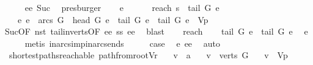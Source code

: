 \begin{isabellebody}
\ \ \ \ \isamarkupfalse%
\ ee{\isacharparenleft}{}{\isacharparenright}\ Suc{\isacharparenleft}{}{\isacharparenright}\ \isamarkupfalse%
\ presburger\isanewline
\ \ \isamarkupfalse%
\ e{\isacharprime}\ \ \isanewline
\ \ \ \ reach{\isacharcolon}\ {\isachardoublequoteopen}s\ {\isasymrightarrow}\isactrlsup {\isacharasterisk}\ tail\ G\ e{\isacharprime}{\isachardoublequoteclose}\ \ \isanewline
\ \ \ \ e{\isacharprime}{\isacharcolon}\ {\isachardoublequoteopen}e{\isacharprime}\ {\isasymin}\ arcs\ G\ {\isasymand}\ head\ G\ e{\isacharprime}\ {\isacharequal}\ tail\ G\ e\ {\isasymand}\ {\isacharparenleft}tail\ G\ e{\isacharprime}{\isacharparenright}\ {\isasymnotin}\ V\isactrlsub p{\isachardoublequoteclose}\ \isanewline
\ \ \ \ \isamarkupfalse%
\ Suc{\isacharparenleft}{}{\isacharparenright}{\isacharbrackleft}OF\ nst\ tail{\isacharunderscore}in{\isacharunderscore}verts{\isacharbrackleft}OF\ ee{\isacharparenleft}{}{\isacharparenright}{\isacharbrackright}\ ss\ ee{\isacharparenleft}{}{\isacharparenright}{\isacharbrackright}\ \isamarkupfalse%
\ blast\isanewline
\ \ \isamarkupfalse%
\ reach\ \isamarkupfalse%
\ \isamarkupfalse%
\ {\isachardoublequoteopen}tail\ G\ e{\isacharprime}\ {\isasymrightarrow}\ tail\ G\ e{\isachardoublequoteclose}\ \isamarkupfalse%
\ e{\isacharprime}\isanewline
\ \ \ \ \isamarkupfalse%
\ {\isacharparenleft}metis\ in{\isacharunderscore}arcs{\isacharunderscore}imp{\isacharunderscore}in{\isacharunderscore}arcs{\isacharunderscore}ends{\isacharparenright}\isanewline
\ \ \isamarkupfalse%
\ \isamarkupfalse%
\ {\isacharquery}case\ \isamarkupfalse%
\ e{\isacharprime}\ ee\ \isamarkupfalse%
\ auto\isanewline
{}\isamarkupfalse%
%
\endisatagproof
{\isafoldproof}%
%
\isadelimproof
\isanewline
%
\endisadelimproof
\isanewline
\isanewline
{}\isamarkupfalse%
\ {\isacharparenleft}\ shortest{\isacharunderscore}paths{\isacharunderscore}reachable{\isacharparenright}\ path{\isacharunderscore}from{\isacharunderscore}root{\isacharunderscore}Vr{\isacharcolon}\isanewline
\ \ \ v\ {\isacharcolon}{\isacharcolon}\ {\isacharprime}a\isanewline
\ \ \ {\isachardoublequoteopen}v\ {\isasymin}\ verts\ G{\isachardoublequoteclose}\isanewline
\ \ \ {\isachardoublequoteopen}v\ {\isasymnotin}\ V\isactrlsub p{\isachardoublequoteclose}\isanewline

\end{isabellebody}

